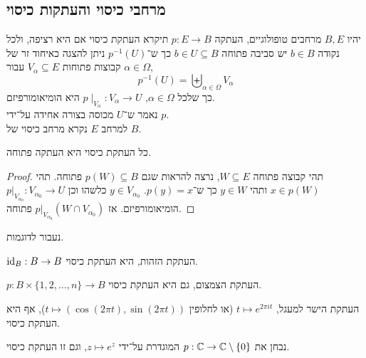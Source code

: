\subsection{מרחבי כיסוי והעתקות כיסוי}
\begin{definition}
	יהיו $B, E$ מרחבים טופולוגיים,
	העתקה $p : E \to B$ תיקרא העתקת כיסוי אם היא רציפה,
	ולכל נקודה $b \in B$ יש סביבה פתוחה $b \in U \subseteq B$ כך ש־$p^{-1}(U)$ ניתן להצגה כאיחוד זר של קבוצות פתוחות $V_{\alpha} \subseteq E$ עבור $\alpha \in \Omega$,
	\[
		p^{-1}(U)
		= \biguplus_{\alpha \in \Omega} V_{\alpha}
	\]
	כך שלכל $\alpha \in \Omega$, $p \mid_{V_{\alpha}} : V_{\alpha} \to U$ היא הומיאומורפיזם. \\
	נאמר ש־$U$ מכוסה בצורה אחידה על־ידי $p$. \\
	למרחב $E$ נקרא מרחב כיסוי של $B$.
\end{definition}
\begin{proposition}
	כל העתקת כיסוי היא העתקה פתוחה.
\end{proposition}
\begin{proof}
	תהי קבוצה פתוחה $W \subseteq E$, נרצה להראות שגם $p(W) \subseteq B$ פתוחה.
	תהי $x \in p(W)$ ותהי $y \in W$ כך ש־$p(y) = x$.
	$y \in V_{\alpha_0}$ כלשהו וכן $p |_{V_{\alpha_0}} : V_{\alpha_0} \to U$ הומיאומורפיזם.
	אז $p |_{V_{\alpha_0}}(W \cap V_{\alpha_0})$ פתוחה.
\end{proof}
נעבור לדוגמות.
\begin{example}
	$\operatorname{id}_B : B \to B$ העתקת הזהות, היא העתקת כיסוי.
\end{example}
\begin{example}
	$p : B \times \{ 1, 2, \ldots, n \} \to B$ העתקת הצמצום, גם היא העתקת כיסוי.
\end{example}
\begin{example}
	העתקת הישר למעגל, $t \mapsto e^{2 \pi i t}$ (או לחלופין $t \mapsto (\cos(2\pi t), \sin(2\pi t))$), אף היא העתקת כיסוי.
\end{example}
\begin{example}
	נבחן את $p : \mathbb{C} \to \mathbb{C} \setminus \{ 0 \}$ המוגדרת על־ידי $z \mapsto e^z$, וגם זו העתקת כיסוי.
\end{example}

\listoftheorems[title=הגדרות ומשפטים,ignoreall,show={theorem,definition},swapnumber,onlynamed={proposition}]


